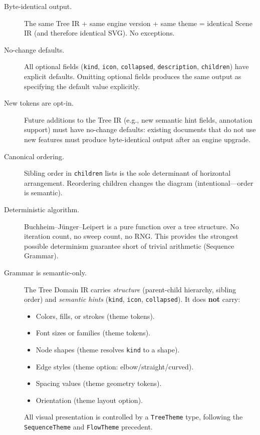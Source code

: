 \begin{description}
  \item[Byte-identical output.] The same Tree IR + same engine version + same theme = identical Scene IR (and therefore identical SVG). No exceptions.
  
  \item[No-change defaults.] All optional fields (\texttt{kind}, \texttt{icon}, \texttt{collapsed}, \texttt{description}, \texttt{children}) have explicit defaults. Omitting optional fields produces the same output as specifying the default value explicitly.
  
  \item[New tokens are opt-in.] Future additions to the Tree IR (e.g., new semantic hint fields, annotation support) must have no-change defaults: existing documents that do not use new features must produce byte-identical output after an engine upgrade.
  
  \item[Canonical ordering.] Sibling order in \texttt{children} lists is the sole determinant of horizontal arrangement. Reordering children changes the diagram (intentional---order is semantic).
  
  \item[Deterministic algorithm.] Buchheim--J{\"u}nger--Leipert is a pure function over a tree structure. No iteration count, no sweep count, no RNG. This provides the strongest possible determinism guarantee short of trivial arithmetic (Sequence Grammar).
  
  \item[Grammar is semantic-only.] The Tree Domain IR carries \emph{structure} (parent-child hierarchy, sibling order) and \emph{semantic hints} (\texttt{kind}, \texttt{icon}, \texttt{collapsed}). It does \textbf{not} carry:
  \begin{itemize}
    \item Colors, fills, or strokes (theme tokens).
    \item Font sizes or families (theme tokens).
    \item Node shapes (theme resolves \texttt{kind} to a shape).
    \item Edge styles (theme option: elbow/straight/curved).
    \item Spacing values (theme geometry tokens).
    \item Orientation (theme layout option).
  \end{itemize}
  All visual presentation is controlled by a \texttt{TreeTheme} type, following the \texttt{SequenceTheme} and \texttt{FlowTheme} precedent.
\end{description}

